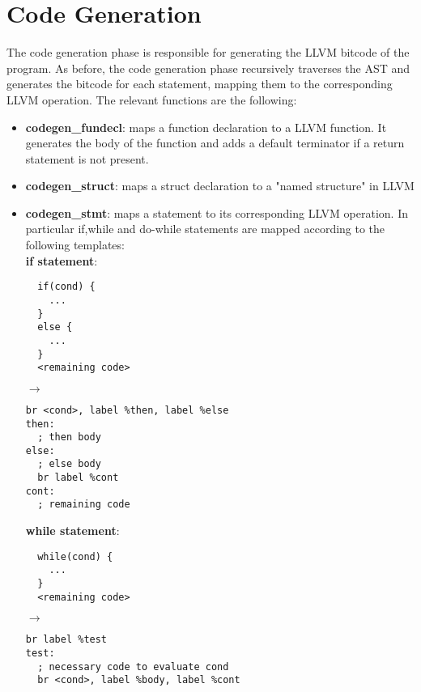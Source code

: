 \documentclass{article}
\begin{document}
\section{Code Generation}
The code generation phase is responsible for generating the LLVM bitcode of the program.
As before, the code generation phase recursively traverses the AST and generates the bitcode for each statement, mapping
them to the corresponding LLVM operation.
The relevant functions are the following:
\begin{itemize}
  \item \textbf{codegen\_fundecl}: maps a function declaration to a LLVM function.
  It generates the body of the function and adds a default terminator if a return statement is not present.
  \item \textbf{codegen\_struct}: maps a struct declaration to a "named structure" in LLVM
  \item \textbf{codegen\_stmt}: maps a statement to its corresponding LLVM operation.
  In particular if,while and do-while statements are mapped according to
  the following templates: \\
  \textbf{if statement}: \\

\begin{minipage}{0.20\textwidth}
\begin{verbatim}
  if(cond) {
    ...
  }
  else {
    ...
  }
  <remaining code>
\end{verbatim}
\end{minipage}
\hspace{1cm} $\rightarrow$ \hspace{0.5cm}
\begin{minipage}{0.45\textwidth}
\begin{verbatim}
br <cond>, label %then, label %else
then:
  ; then body
else:
  ; else body
  br label %cont
cont:
  ; remaining code
\end{verbatim}
\end{minipage}


\textbf{while statement}: \\

\begin{minipage}{0.20\textwidth}
\begin{verbatim}
  while(cond) {
    ...
  }
  <remaining code>
\end{verbatim}
\end{minipage}
\hspace{1cm} $\rightarrow$ \hspace{0.5cm}
\begin{minipage}{0.45\textwidth}
\begin{verbatim}
br label %test
test:
  ; necessary code to evaluate cond
  br <cond>, label %body, label %cont


\end{verbatim}
\end{minipage}
\end{itemize}
\end{document}
